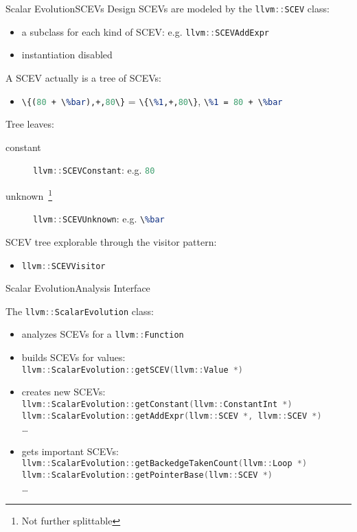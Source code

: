 \documentclass[10pt,mathserif]{beamer}
\newcommand{\cppinline}[1]{\lstinline[language=C++]!#1!}
\newcommand{\llvminline}[1]{\lstinline[language=LLVM]!#1!}
\begin{document}
\begin{frame}{Scalar Evolution}{SCEVs Design}
SCEVs are modeled by the \cppinline{llvm::SCEV} class:

\begin{itemize}
\item a subclass for each kind of SCEV: e.g. \cppinline{llvm::SCEVAddExpr}
\item instantiation disabled
\end{itemize}

A SCEV actually is a tree of SCEVs:

\begin{itemize}
\item \llvminline{\{(80 + \%bar),+,80\}} = \llvminline{\{\%1,+,80\}},
      \llvminline{\%1 = 80 + \%bar}
\end{itemize}

Tree leaves:

\begin{description}
\item[constant] \cppinline{llvm::SCEVConstant}: e.g. \llvminline{80}
\item[unknown~\footnote{Not further splittable}] \cppinline{llvm::SCEVUnknown}:
                                                 e.g. \llvminline{\%bar}
\end{description}

SCEV tree explorable through the visitor pattern:

\begin{itemize}
\item \cppinline{llvm::SCEVVisitor}
\end{itemize}
\end{frame}

\begin{frame}{Scalar Evolution}{Analysis Interface}

The \cppinline{llvm::ScalarEvolution} class:

\begin{itemize}
\item analyzes SCEVs for a \cppinline{llvm::Function}
\item builds SCEVs for values: \\
      \cppinline{llvm::ScalarEvolution::getSCEV(llvm::Value *)}
\item creates new SCEVs: \\
\cppinline{llvm::ScalarEvolution::getConstant(llvm::ConstantInt *)} \\
\cppinline{llvm::ScalarEvolution::getAddExpr(llvm::SCEV *, llvm::SCEV *)} \\
\ldots
\item gets important SCEVs: \\
      \cppinline{llvm::ScalarEvolution::getBackedgeTakenCount(llvm::Loop *)} \\
      \cppinline{llvm::ScalarEvolution::getPointerBase(llvm::SCEV *)} \\
      \ldots
\end{itemize}
\end{frame}
\end{document}
